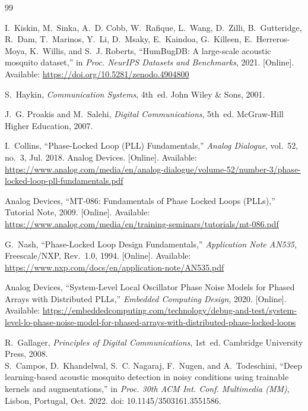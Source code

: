 \begin{thebibliography}{99}
	
	I.~Kiskin, M.~Sinka, A.~D. Cobb, W.~Rafique, L.~Wang, D.~Zilli, B.~Gutteridge, 
	R.~Dam, T.~Marinos, Y.~Li, D.~Msaky, E.~Kaindoa, G.~Killeen, E.~Herreros-Moya,
	K.~Willis, and S.~J. Roberts, ``HumBugDB: A large-scale acoustic mosquito dataset,'' 
	in \emph{Proc. NeurIPS Datasets and Benchmarks}, 2021. [Online]. 
	Available: \url{https://doi.org/10.5281/zenodo.4904800}
	
	
	S.~Haykin, \emph{Communication Systems}, 4th~ed.  
	John Wiley \& Sons, 2001.
	
	J.~G. Proakis and M.~Salehi, \emph{Digital Communications}, 5th~ed.  
	McGraw-Hill Higher Education, 2007.
	
	I.~Collins, ``Phase-Locked Loop (PLL) Fundamentals,'' \emph{Analog Dialogue}, 
	vol.~52, no.~3, Jul. 2018. Analog Devices. 
	[Online]. Available: \url{https://www.analog.com/media/en/analog-dialogue/volume-52/number-3/phase-locked-loop-pll-fundamentals.pdf}
	
	Analog Devices, ``MT-086: Fundamentals of Phase Locked Loops (PLLs),'' 
	Tutorial Note, 2009. 
	[Online]. Available: \url{https://www.analog.com/media/en/training-seminars/tutorials/mt-086.pdf}
	
	G.~Nash, ``Phase-Locked Loop Design Fundamentals,'' 
	\emph{Application Note AN535}, Freescale/NXP, Rev.~1.0, 1994. 
	[Online]. Available: \url{https://www.nxp.com/docs/en/application-note/AN535.pdf}
	
	Analog Devices, ``System-Level Local Oscillator Phase Noise Models for Phased Arrays with Distributed PLLs,'' 
	\emph{Embedded Computing Design}, 2020. 
	[Online]. Available: \url{https://embeddedcomputing.com/technology/debug-and-test/system-level-lo-phase-noise-model-for-phased-arrays-with-distributed-phase-locked-loops}
	
	
	R.~Gallager, \emph{Principles of Digital Communications}, 1st~ed.  
	Cambridge University Press, 2008.
	\\
	
	S.~Campos, D.~Khandelwal, S.~C. Nagaraj, F.~Nugen, and A.~Todeschini,
	``Deep learning-based acoustic mosquito detection in noisy conditions using trainable kernels and augmentations,''
	in \emph{Proc. 30th ACM Int. Conf. Multimedia (MM)}, Lisbon, Portugal, Oct. 2022.
	doi: 10.1145/3503161.3551586.
	

\end{thebibliography}
